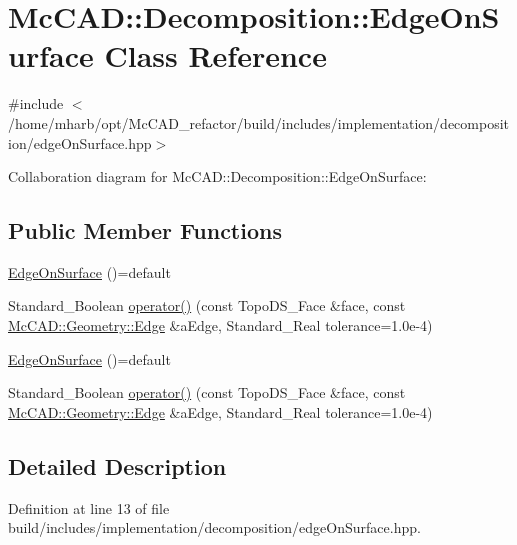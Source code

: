 \hypertarget{classMcCAD_1_1Decomposition_1_1EdgeOnSurface}{}\section{Mc\+C\+AD\+:\+:Decomposition\+:\+:Edge\+On\+Surface Class Reference}
\label{classMcCAD_1_1Decomposition_1_1EdgeOnSurface}


{\ttfamily \#include $<$/home/mharb/opt/\+Mc\+C\+A\+D\+\_\+refactor/build/includes/implementation/decomposition/edge\+On\+Surface.\+hpp$>$}



Collaboration diagram for Mc\+C\+AD\+:\+:Decomposition\+:\+:Edge\+On\+Surface\+:
\subsection*{Public Member Functions}
\begin{DoxyCompactItemize}
\item 
\hyperlink{classMcCAD_1_1Decomposition_1_1EdgeOnSurface_ab02451097f81ffc247fce5b41cfa83d0}{Edge\+On\+Surface} ()=default
\item 
Standard\+\_\+\+Boolean \hyperlink{classMcCAD_1_1Decomposition_1_1EdgeOnSurface_aa8bb545b92845ce64f17876b50a412dc}{operator()} (const Topo\+D\+S\+\_\+\+Face \&face, const \hyperlink{classMcCAD_1_1Geometry_1_1Edge}{Mc\+C\+A\+D\+::\+Geometry\+::\+Edge} \&a\+Edge, Standard\+\_\+\+Real tolerance=1.\+0e-\/4)
\item 
\hyperlink{classMcCAD_1_1Decomposition_1_1EdgeOnSurface_ab02451097f81ffc247fce5b41cfa83d0}{Edge\+On\+Surface} ()=default
\item 
Standard\+\_\+\+Boolean \hyperlink{classMcCAD_1_1Decomposition_1_1EdgeOnSurface_aa8bb545b92845ce64f17876b50a412dc}{operator()} (const Topo\+D\+S\+\_\+\+Face \&face, const \hyperlink{classMcCAD_1_1Geometry_1_1Edge}{Mc\+C\+A\+D\+::\+Geometry\+::\+Edge} \&a\+Edge, Standard\+\_\+\+Real tolerance=1.\+0e-\/4)
\end{DoxyCompactItemize}


\subsection{Detailed Description}


Definition at line 13 of file build/includes/implementation/decomposition/edge\+On\+Surface.\+hpp.



